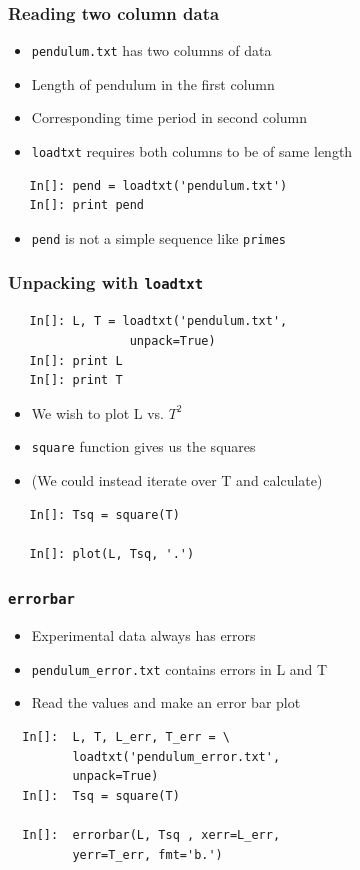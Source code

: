 \begin{frame}[fragile]
  \frametitle{Reading two column data}
  \begin{itemize}
  \item \texttt{pendulum.txt} has two columns of data
  \item Length of pendulum in the first column 
  \item Corresponding time period in second column
  \item \texttt{loadtxt} requires both columns to be of same length
  \end{itemize}
  \begin{lstlisting}
   In[]: pend = loadtxt('pendulum.txt')
   In[]: print pend
  \end{lstlisting}
  \begin{itemize}
  \item \texttt{pend} is not a simple sequence like \texttt{primes}
  \end{itemize}
\end{frame}

\begin{frame}[fragile]
  \frametitle{Unpacking with \texttt{loadtxt}}
  \begin{lstlisting}
   In[]: L, T = loadtxt('pendulum.txt',
                 unpack=True)
   In[]: print L
   In[]: print T
  \end{lstlisting}
  \begin{itemize}
  \item We wish to plot L vs. $T^2$
  \item \texttt{square} function gives us the squares
  \item (We could instead iterate over T and calculate)
  \end{itemize}
  \begin{lstlisting}
   In[]: Tsq = square(T)

   In[]: plot(L, Tsq, '.')
  \end{lstlisting}
\end{frame}

\begin{frame}[fragile]
  \frametitle{\texttt{errorbar}}
  \begin{itemize}
  \item Experimental data always has errors
  \item \texttt{pendulum\_error.txt} contains errors in L and T
  \item Read the values and make an error bar plot
  \end{itemize}
  \begin{lstlisting}
  In[]:  L, T, L_err, T_err = \
         loadtxt('pendulum_error.txt',
         unpack=True)
  In[]:  Tsq = square(T)

  In[]:  errorbar(L, Tsq , xerr=L_err, 
         yerr=T_err, fmt='b.')
  \end{lstlisting}
\end{frame}

